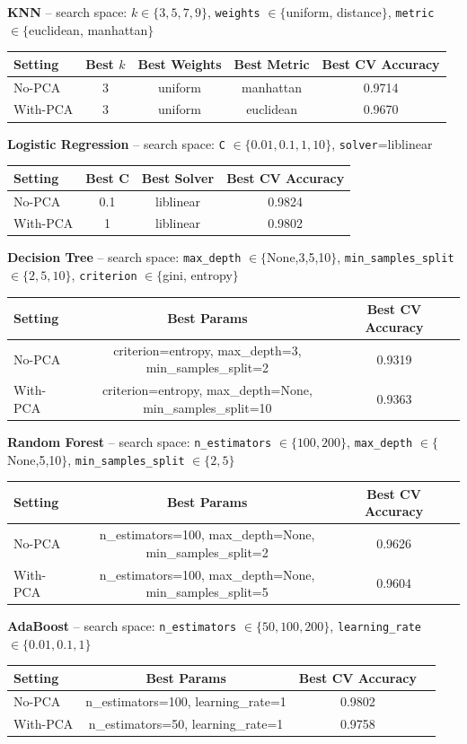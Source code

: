 \documentclass[12pt,a4paper]{article}
\begin{document}
\textbf{KNN} -- search space: $k\in\{3,5,7,9\}$, \texttt{weights} $\in\{$uniform, distance$\}$, \texttt{metric} $\in\{$euclidean, manhattan$\}$
\begin{longtable}{lcccc}
\toprule
Setting & Best $k$ & Best Weights & Best Metric & Best CV Accuracy\\
\midrule
No-PCA & 3 & uniform & manhattan & 0.9714\\
With-PCA & 3 & uniform & euclidean & 0.9670\\
\bottomrule
\end{longtable}

\textbf{Logistic Regression} -- search space: \texttt{C} $\in\{0.01,0.1,1,10\}$, \texttt{solver}=liblinear
\begin{longtable}{lccc}
\toprule
Setting & Best C & Best Solver & Best CV Accuracy\\
\midrule
No-PCA & 0.1 & liblinear & 0.9824\\
With-PCA & 1 & liblinear & 0.9802\\
\bottomrule
\end{longtable}

\textbf{Decision Tree} -- search space: \texttt{max\_depth} $\in\{$None,3,5,10$\}$, \texttt{min\_samples\_split} $\in\{2,5,10\}$, \texttt{criterion} $\in\{$gini, entropy$\}$
\begin{longtable}{lccc}
\toprule
Setting & Best Params & Best CV Accuracy\\
\midrule
No-PCA & criterion=entropy, max\_depth=3, min\_samples\_split=2 & 0.9319\\
With-PCA & criterion=entropy, max\_depth=None, min\_samples\_split=10 & 0.9363\\
\bottomrule
\end{longtable}

\textbf{Random Forest} -- search space: \texttt{n\_estimators} $\in\{100,200\}$, \texttt{max\_depth} $\in\{$None,5,10$\}$, \texttt{min\_samples\_split} $\in\{2,5\}$
\begin{longtable}{lccc}
\toprule
Setting & Best Params & Best CV Accuracy\\
\midrule
No-PCA & n\_estimators=100, max\_depth=None, min\_samples\_split=2 & 0.9626\\
With-PCA & n\_estimators=100, max\_depth=None, min\_samples\_split=5 & 0.9604\\
\bottomrule
\end{longtable}

\textbf{AdaBoost} -- search space: \texttt{n\_estimators} $\in\{50,100,200\}$, \texttt{learning\_rate} $\in\{0.01,0.1,1\}$
\begin{longtable}{lccc}
\toprule
Setting & Best Params & Best CV Accuracy\\
\midrule
No-PCA & n\_estimators=100, learning\_rate=1 & 0.9802\\
With-PCA & n\_estimators=50, learning\_rate=1 & 0.9758\\
\bottomrule
\end{longtable}
\end{document}
